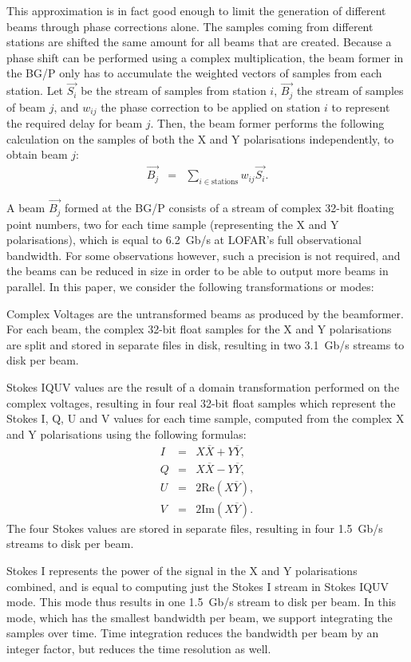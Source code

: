 \documentclass{llncs}
\begin{document}
This approximation is in fact good enough to limit the generation of different beams through phase corrections alone. The samples coming from different stations are shifted the same amount for all beams that are created. Because a phase shift can be performed using a complex multiplication, the beam former in the BG/P only has to accumulate the weighted vectors of samples from each station. Let $\overrightarrow{S_i}$ be the stream of samples from station $i$, $\overrightarrow{B_j}$ the stream of samples of beam $j$, and $w_{ij}$ the phase correction to be applied on station $i$ to represent the required delay for beam $j$. Then, the beam former performs the following calculation on the samples of both the X and Y polarisations independently, to obtain beam $j$:
\begin{eqnarray}
\overrightarrow{B_j} & = & \sum_{i \in \textrm{stations}}w_{ij}\overrightarrow{S_i}.
\end{eqnarray}

A beam $\overrightarrow{B_j}$ formed at the BG/P consists of a stream of complex 32-bit floating point numbers, two for each time sample (representing the X and Y polarisations), which is equal to 6.2~Gb/s at LOFAR's full observational bandwidth. For some observations however, such a precision is not required, and the beams can be reduced in size in order to be able to output more beams in parallel. In this paper, we consider the following transformations or modes:
\begin{description}
\item{Complex Voltages} are the untransformed beams as produced by the beamformer. For each beam, the complex 32-bit float samples for the X and Y polarisations are split and stored in separate files in disk, resulting in two 3.1~Gb/s streams to disk per beam.
\item{Stokes IQUV} values are the result of a domain transformation performed on the complex voltages, resulting in four real 32-bit float samples which represent the Stokes I, Q, U and V values for each time sample, computed from the complex X and Y polarisations using the following formulas:
\begin{eqnarray}
I & = & X\overline{X} + Y\overline{Y}, \\
Q & = & X\overline{X} - Y\overline{Y}, \\
U & = & 2\mathrm{Re}(X\overline{Y}), \\
V & = & 2\mathrm{Im}(X\overline{Y}).
\end{eqnarray}
The four Stokes values are stored in separate files, resulting in four 1.5~Gb/s streams to disk per beam.
\item{Stokes I} represents the power of the signal in the X and Y polarisations combined, and is equal to computing just the Stokes I stream in Stokes IQUV mode. This mode thus results in one 1.5~Gb/s stream to disk per beam. In this mode, which has the smallest bandwidth per beam, we support integrating the samples over time. Time integration reduces the bandwidth per beam by an integer factor, but reduces the time resolution as well.
\end{description}
\end{document}
